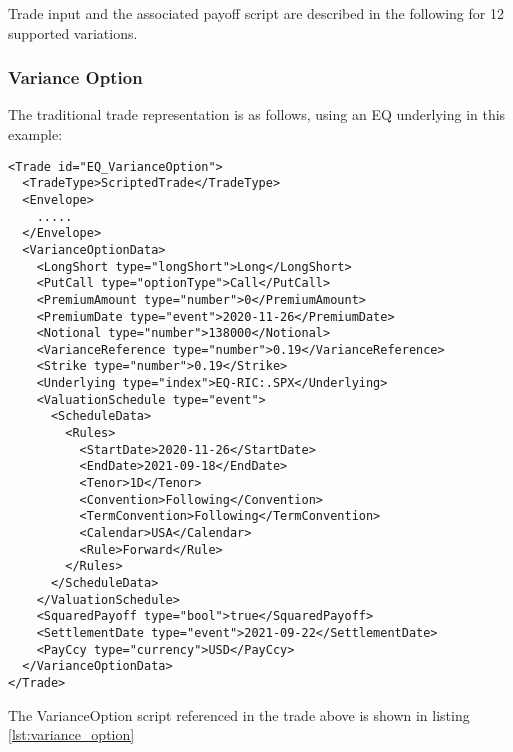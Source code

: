 Trade input and the associated payoff script are described in the following for 12 supported variations.

\subsubsection*{Variance Option}

The traditional trade representation is as follows, using an EQ underlying in this example:

\begin{verbatim}
<Trade id="EQ_VarianceOption">
  <TradeType>ScriptedTrade</TradeType>
  <Envelope>
    .....
  </Envelope>
  <VarianceOptionData>
    <LongShort type="longShort">Long</LongShort>
    <PutCall type="optionType">Call</PutCall>
    <PremiumAmount type="number">0</PremiumAmount>
    <PremiumDate type="event">2020-11-26</PremiumDate>
    <Notional type="number">138000</Notional>
    <VarianceReference type="number">0.19</VarianceReference>
    <Strike type="number">0.19</Strike>
    <Underlying type="index">EQ-RIC:.SPX</Underlying>
    <ValuationSchedule type="event">
      <ScheduleData>
        <Rules>
          <StartDate>2020-11-26</StartDate>
          <EndDate>2021-09-18</EndDate>
          <Tenor>1D</Tenor>
          <Convention>Following</Convention>
          <TermConvention>Following</TermConvention>
          <Calendar>USA</Calendar>
          <Rule>Forward</Rule>
        </Rules>
      </ScheduleData>
    </ValuationSchedule>
    <SquaredPayoff type="bool">true</SquaredPayoff>
    <SettlementDate type="event">2021-09-22</SettlementDate>
    <PayCcy type="currency">USD</PayCcy>
  </VarianceOptionData>
</Trade>
\end{verbatim}

The VarianceOption script referenced in the trade above is shown in listing
\ref{lst:variance_option}

